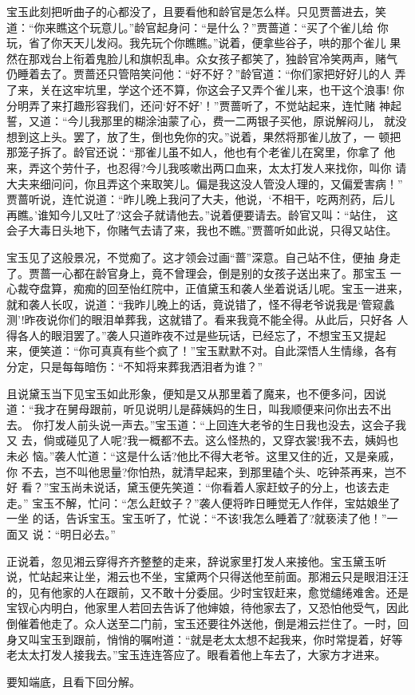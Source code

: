 宝玉此刻把听曲子的心都没了，且要看他和龄官是怎么样。只见贾蔷进去，笑
道：“你来瞧这个玩意儿。”龄官起身问：“是什么？”贾蔷道：“买了个雀儿给
你玩，省了你天天儿发闷。我先玩个你瞧瞧。”说着，便拿些谷子，哄的那个雀儿
果然在那戏台上衔着鬼脸儿和旗帜乱串。众女孩子都笑了，独龄官冷笑两声，赌气
仍睡着去了。贾蔷还只管陪笑问他：“好不好？”龄官道：“你们家把好好儿的人
弄了来，关在这牢坑里，学这个还不算，你这会子又弄个雀儿来，也干这个浪事!
你分明弄了来打趣形容我们，还问‘好不好’！”贾蔷听了，不觉站起来，连忙赌
神起誓，又道：“今儿我那里的糊涂油蒙了心，费一二两银子买他，原说解闷儿，
就没想到这上头。罢了，放了生，倒也免你的灾。”说着，果然将那雀儿放了，一
顿把那笼子拆了。龄官还说：“那雀儿虽不如人，他也有个老雀儿在窝里，你拿了
他来，弄这个劳什子，也忍得?今儿我咳嗽出两口血来，太太打发人来找你，叫你
请大夫来细问问，你且弄这个来取笑儿。偏是我这没人管没人理的，又偏爱害病！”
贾蔷听说，连忙说道：“昨儿晚上我问了大夫，他说，‘不相干，吃两剂药，后儿
再瞧。’谁知今儿又吐了?这会子就请他去。”说着便要请去。龄官又叫：“站住，
这会子大毒日头地下，你赌气去请了来，我也不瞧。”贾蔷听如此说，只得又站住。

宝玉见了这般景况，不觉痴了。这才领会过画“蔷”深意。自己站不住，便抽
身走了。贾蔷一心都在龄官身上，竟不曾理会，倒是别的女孩子送出来了。那宝玉
一心裁夺盘算，痴痴的回至怡红院中，正值黛玉和袭人坐着说话儿呢。宝玉一进来，
就和袭人长叹，说道：“我昨儿晚上的话，竟说错了，怪不得老爷说我是‘管窥蠡
测’!昨夜说你们的眼泪单葬我，这就错了。看来我竟不能全得。从此后，只好各
人得各人的眼泪罢了。”袭人只道昨夜不过是些玩话，已经忘了，不想宝玉又提起
来，便笑道：“你可真真有些个疯了！”宝玉默默不对。自此深悟人生情缘，各有
分定，只是每每暗伤：“不知将来葬我洒泪者为谁？”

且说黛玉当下见宝玉如此形象，便知是又从那里着了魔来，也不便多问，因说
道：“我才在舅母跟前，听见说明儿是薛姨妈的生日，叫我顺便来问你出去不出去。
你打发人前头说一声去。”宝玉道：“上回连大老爷的生日我也没去，这会子我又
去，倘或碰见了人呢?我一概都不去。这么怪热的，又穿衣裳!我不去，姨妈也未必
恼。”袭人忙道：“这是什么话?他比不得大老爷。这里又住的近，又是亲戚，你
不去，岂不叫他思量?你怕热，就清早起来，到那里磕个头、吃钟茶再来，岂不好
看？”宝玉尚未说话，黛玉便先笑道：“你看着人家赶蚊子的分上，也该去走走。”
宝玉不解，忙问：“怎么赶蚊子？”袭人便将昨日睡觉无人作伴，宝姑娘坐了一坐
的话，告诉宝玉。宝玉听了，忙说：“不该!我怎么睡着了?就亵渎了他！”一面又
说：“明日必去。”

正说着，忽见湘云穿得齐齐整整的走来，辞说家里打发人来接他。宝玉黛玉听
说，忙站起来让坐，湘云也不坐，宝黛两个只得送他至前面。那湘云只是眼泪汪汪
的，见有他家的人在跟前，又不敢十分委屈。少时宝钗赶来，愈觉缱绻难舍。还是
宝钗心内明白，他家里人若回去告诉了他婶娘，待他家去了，又恐怕他受气，因此
倒催着他走了。众人送至二门前，宝玉还要往外送他，倒是湘云拦住了。一时，回
身又叫宝玉到跟前，悄悄的嘱咐道：“就是老太太想不起我来，你时常提着，好等
老太太打发人接我去。”宝玉连连答应了。眼看着他上车去了，大家方才进来。

要知端底，且看下回分解。